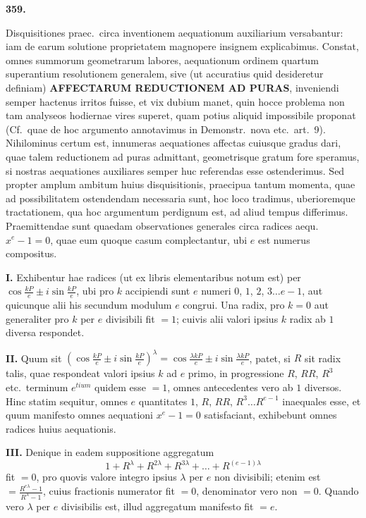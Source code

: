 \documentclass[12pt,a4paper]{article}
\theoremstyle{plain}
\theoremstyle{definition}
\theoremstyle{remark}
\begin{document}
\begin{center}
\textbf{359.}
\end{center}

Disquisitiones praec.\ circa inventionem aequationum auxiliarium versabantur: iam de earum solutione proprietatem magnopere insignem explicabimus. Constat, omnes summorum geometrarum labores, aequationum ordinem quartum superantium resolutionem generalem, sive (ut accuratius quid desideretur definiam) \textbf{AFFECTARUM REDUCTIONEM AD PURAS}, inveniendi semper hactenus irritos fuisse, et vix dubium manet, quin hocce problema non tam analyseos hodiernae vires superet, quam potius aliquid impossibile proponat (Cf.\ quae de hoc argumento annotavimus in Demonstr.\ nova etc.\ art.\ 9). Nihilominus certum est, innumeras aequationes affectas cuiusque gradus dari, quae talem reductionem ad puras admittant, geometrisque gratum fore speramus, si nostras aequationes auxiliares semper huc referendas esse ostenderimus. Sed propter amplum ambitum huius disquisitionis, praecipua tantum momenta, quae ad possibilitatem ostendendam necessaria sunt, hoc loco tradimus, uberioremque tractationem, qua hoc argumentum perdignum est, ad aliud tempus differimus. Praemittendae sunt quaedam observationes generales circa radices aequ.\ $x^e - 1 = 0$, quae eum quoque casum complectantur, ubi $e$ est numerus compositus.

\textbf{I.} Exhibentur hae radices (ut ex libris elementaribus notum est) per $\cos\tfrac{kP}{e} \pm i\sin\tfrac{kP}{e}$, ubi pro $k$ accipiendi sunt $e$ numeri $0$, $1$, $2$, $3 \ldots e-1$, aut quicunque alii his secundum modulum $e$ congrui. Una radix, pro $k = 0$ aut generaliter pro $k$ per $e$ divisibili fit $= 1$; cuivis alii valori ipsius $k$ radix ab $1$ diversa respondet.

\textbf{II.} Quum sit $\left(\cos\tfrac{kP}{e} \pm i\sin\tfrac{kP}{e}\right)^\lambda = \cos\tfrac{\lambda kP}{e} \pm i\sin\tfrac{\lambda kP}{e}$, patet, si $R$ sit radix talis, quae respondeat valori ipsius $k$ ad $e$ primo, in progressione $R$, $RR$, $R^3$ etc.\ terminum $e^{tium}$ quidem esse $= 1$, omnes antecedentes vero ab $1$ diversos. Hinc statim sequitur, omnes $e$ quantitates $1$, $R$, $RR$, $R^3 \ldots R^{e-1}$ inaequales esse, et quum manifesto omnes aequationi $x^e - 1 = 0$ satisfaciant, exhibebunt omnes radices huius aequationis.

\textbf{III.} Denique in eadem suppositione aggregatum
\[1 + R^\lambda + R^{2\lambda} + R^{3\lambda} + \ldots + R^{(e-1)\lambda}\]
fit $= 0$, pro quovis valore integro ipsius $\lambda$ per $e$ non divisibili; etenim est $= \tfrac{R^{e\lambda} - 1}{R^\lambda - 1}$, cuius fractionis numerator fit $= 0$, denominator vero non $= 0$. Quando vero $\lambda$ per $e$ divisibilis est, illud aggregatum manifesto fit $= e$.
\end{document}
